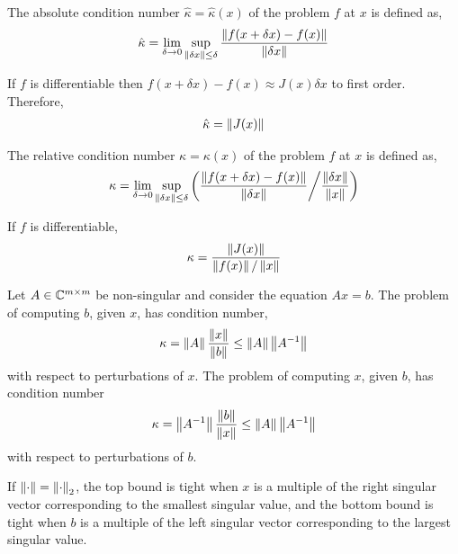 \documentclass[12pt]{article}
\begin{document}
\begin{definition}
The absolute condition number \( \hat{\kappa} = \hat{\kappa}(x) \) of the problem \( f \) at \( x \) is defined as,
\begin{align*}
    \hat{\kappa} = \lim_{\delta\to 0} \sup_{\left\lVert\delta x\right\rVert\leq \delta} \dfrac{\left\lVert f(x+\delta x) - f(x)\right\rVert}{\left\lVert\delta x\right\rVert}
\end{align*}
\end{definition}

If \( f \) is differentiable then \( f(x+\delta x) - f(x) \approx J(x) \delta x \) to first order. Therefore,
\begin{align*}
    \hat{\kappa} = \left\lVert J(x)\right\rVert
\end{align*}

\begin{definition}
The relative condition number \( \kappa = \kappa(x) \) of the problem \( f \) at \( x \) is defined as,
\begin{align*}
    \kappa = \lim_{\delta \to 0} \sup_{\left\lVert\delta x\right\rVert\leq \delta} \left( \dfrac{\left\lVert f(x+\delta x) - f(x)\right\rVert}{\left\lVert\delta x\right\rVert} \bigg/ \dfrac{\left\lVert\delta x\right\rVert }{\left\lVert x\right\rVert} \right)
\end{align*}
\end{definition}

If \( f \) is differentiable,
\begin{align*}
    \kappa = \dfrac{\left\lVert J(x)\right\rVert}{\left\lVert f(x)\right\rVert/\left\lVert x\right\rVert}
\end{align*}

\begin{theorem}
Let \( A\in \mathbb{C}^{m\times m} \) be non-singular and consider the equation \( Ax=b \). The problem of computing \( b \), given \( x \), has condition number,
\begin{align*}
    \kappa = \left\lVert A\right\rVert \dfrac{\left\lVert x\right\rVert}{\left\lVert b\right\rVert} \leq \left\lVert A\right\rVert\left\lVert A^{-1}\right\rVert
\end{align*}
with respect to perturbations of \( x \). The problem of computing \( x \), given \( b \), has condition number
\begin{align*}
    \kappa = \left\lVert A^{-1}\right\rVert \dfrac{\left\lVert b\right\rVert}{\left\lVert x\right\rVert} \leq \left\lVert A\right\rVert\left\lVert A^{-1}\right\rVert
\end{align*}
with respect to perturbations of \( b \).

If \( \left\lVert\cdot\right\rVert = \left\lVert\cdot\right\rVert_2 \), the top bound is tight when \( x \) is a multiple of the right singular vector corresponding to the smallest singular value, and the bottom bound is tight when \( b \) is a multiple of the left singular vector corresponding to the largest singular value.
\end{theorem}
\end{document}
